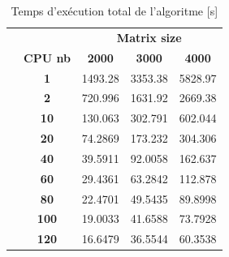 \documentclass[12pt,a4paper,oneside, titlepage]{report}
\begin{document}
	\begin{table}[H]
\begin{tabular}{lc|l|l|l|}
\cline{3-5}
                      & \multicolumn{1}{l|}{} & \multicolumn{3}{c|}{\textbf{Matrix size}}                                                                    \\ \cline{2-5}
\multicolumn{1}{l|}{} & \textbf{CPU nb}       & \multicolumn{1}{c|}{\textbf{2000}} & \multicolumn{1}{c|}{\textbf{3000}} & \multicolumn{1}{c|}{\textbf{4000}} \\ \cline{2-5}
\multicolumn{1}{l|}{} & \textbf{1}            & 1493.28                            & 3353.38                            & 5828.97                            \\ \cline{2-5}
\multicolumn{1}{l|}{} & \textbf{2}            & 720.996                            & 1631.92                            & 2669.38                            \\ \cline{2-5}
\multicolumn{1}{l|}{} & \textbf{10}           & 130.063                            & 302.791                            & 602.044                            \\ \cline{2-5}
\multicolumn{1}{l|}{} & \textbf{20}           & 74.2869                            & 173.232                            & 304.306                            \\ \cline{2-5}
\multicolumn{1}{l|}{} & \textbf{40}           & 39.5911                            & 92.0058                            & 162.637                            \\ \cline{2-5}
\multicolumn{1}{l|}{} & \textbf{60}           & 29.4361                            & 63.2842                            & 112.878                            \\ \cline{2-5}
\multicolumn{1}{l|}{} & \textbf{80}           & 22.4701                            & 49.5435                            & 89.8998                            \\ \cline{2-5}
\multicolumn{1}{l|}{} & \textbf{100}          & 19.0033                            & 41.6588                            & 73.7928                            \\ \cline{2-5}
\multicolumn{1}{l|}{} & \textbf{120}          & 16.6479                            & 36.5544                            & 60.3538                            \\ \cline{2-5}
\end{tabular}
\caption{Temps d'exécution total de l'algoritme [s]}
\end{table}
\end{document}
